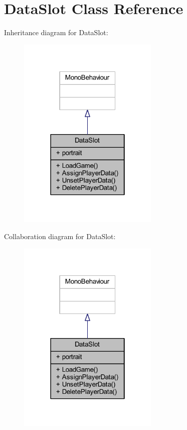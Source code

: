 \hypertarget{class_data_slot}{}\section{Data\+Slot Class Reference}
\label{class_data_slot}


Inheritance diagram for Data\+Slot\+:\nopagebreak
\begin{figure}[H]
\begin{center}
\leavevmode
\includegraphics[width=190pt]{class_data_slot__inherit__graph}
\end{center}
\end{figure}


Collaboration diagram for Data\+Slot\+:\nopagebreak
\begin{figure}[H]
\begin{center}
\leavevmode
\includegraphics[width=190pt]{class_data_slot__coll__graph}
\end{center}
\end{figure}
